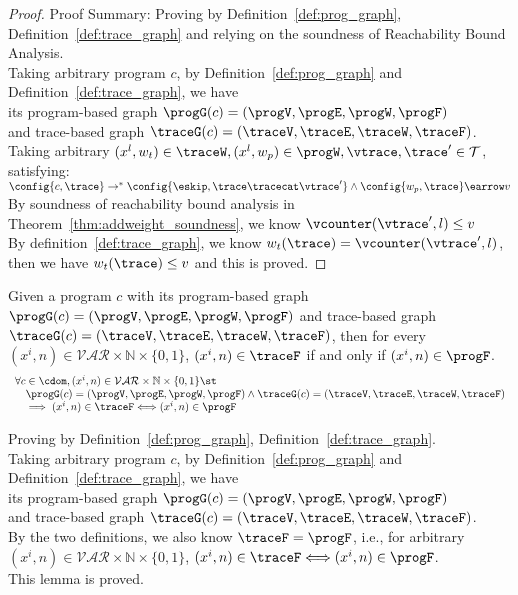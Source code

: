 \begin{proof}
Proof Summary: Proving by Definition~\ref{def:prog_graph}, Definition~\ref{def:trace_graph} and relying on the soundness of Reachability Bound 
Analysis.
\\
Taking arbitrary program $c$,
by Definition~\ref{def:prog_graph} and Definition~\ref{def:trace_graph}, 
we have   
\\
its program-based graph $\progG({c}) = (\progV, \progE, \progW, \progF)$ 
\\
and 
trace-based graph $\traceG({c}) = (\traceV, \traceE, \traceW, \traceF)$.
\\
Taking arbitrary 
$(x^l, w_{t}) \in \traceW, (x^l, w_{p}) \in \progW, \vtrace, \trace' \in \mathcal{T}$, satisfying:
\\
$\config{{c}, \trace} \to^{*} \config{\eskip, \trace\tracecat\vtrace'} 
\land 
\config{w_{p}, \trace} \earrow v$
\\
By soundness of reachability bound analysis in Theorem~\ref{thm:addweight_soundness}, we know 
$\vcounter(\vtrace', l) \leq v$
\\
By definition~\ref{def:trace_graph}, we know $w_t(\trace) = \vcounter(\vtrace', l)$,
then we have $w_t(\trace) \leq v$ and this is proved.
\end{proof}
%
\begin{lem}
	\label{lem:queryvertex_map}
	Given a program $c$ with its
	program-based graph $\progG({c}) = (\progV, \progE, \progW, \progF)$
	and 
	trace-based graph $\traceG({c}) = (\traceV, \traceE, \traceW, \traceF)$,
	then for every $(x^i, n) \in \mathcal{VAR} \times \mathbb{N}  \times \{0, 1\} $,
	 $(x^i, n) \in \traceF$ if and only if $ (x^i, n) \in \progF$.
	\[
	\begin{array}{l}
	\forall c \in \cdom , (x^i, n) \in \mathcal{VAR} \times \mathbb{N}  \times \{0, 1\} 
	 \st 
	 \\ \quad
	 \progG({c}) = (\progV, \progE, \progW, \progF)
	\land 
	\traceG({c}) = (\traceV, \traceE, \traceW, \traceF)
	\\ \quad
	\implies
	(x^i, n) \in \traceF \Longleftrightarrow  (x^i, n) \in \progF
	\end{array}
	\]
	\end{lem}
\begin{subproof}
Proving by Definition~\ref{def:prog_graph}, Definition~\ref{def:trace_graph}.
\\
Taking arbitrary program $c$,
by Definition~\ref{def:prog_graph} and Definition~\ref{def:trace_graph}, 
we have   
\\
its program-based graph $\progG({c}) = (\progV, \progE, \progW, \progF)$ 
\\
and 
trace-based graph $\traceG({c}) = (\traceV, \traceE, \traceW, \traceF)$.
\\
By the two definitions, we also know $\traceF  = \progF$, 
i.e., 
for arbitrary $ (x^i, n) \in \mathcal{VAR} \times \mathbb{N}  \times \{0, 1\} $,
 $(x^i, n) \in \traceF \Longleftrightarrow  (x^i, n) \in \progF$.
 \\
 This lemma is proved.
\end{subproof}